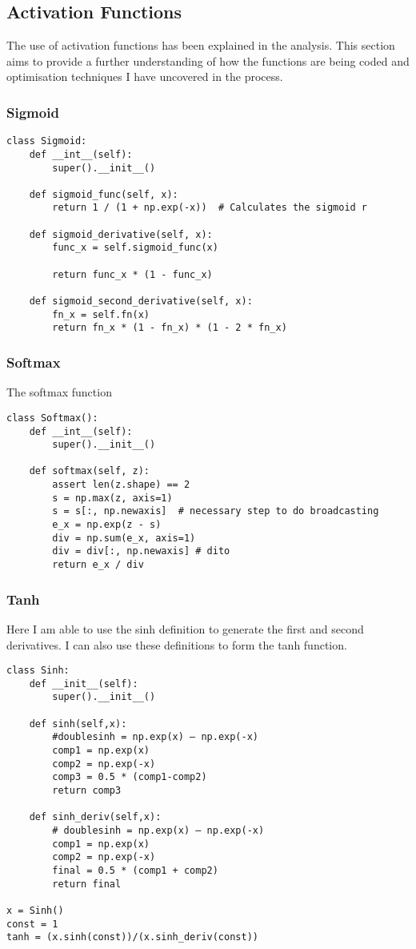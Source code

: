 \documentclass{article}
\begin{document}
\subsection{Activation Functions}
The use of activation functions has been explained in the analysis. This section
aims to provide a further understanding of how the functions are being coded and
optimisation techniques I have uncovered in the process.
\subsubsection{Sigmoid}
\begin{lstlisting}
class Sigmoid:
    def __int__(self):
        super().__init__()

    def sigmoid_func(self, x):
        return 1 / (1 + np.exp(-x))  # Calculates the sigmoid r

    def sigmoid_derivative(self, x):
        func_x = self.sigmoid_func(x)

        return func_x * (1 - func_x)

    def sigmoid_second_derivative(self, x):
        fn_x = self.fn(x)
        return fn_x * (1 - fn_x) * (1 - 2 * fn_x)

\end{lstlisting}
\subsubsection{Softmax}
The softmax function


\begin{lstlisting}
class Softmax():
    def __int__(self):
        super().__init__()

    def softmax(self, z):
        assert len(z.shape) == 2
        s = np.max(z, axis=1)
        s = s[:, np.newaxis]  # necessary step to do broadcasting
        e_x = np.exp(z - s)
        div = np.sum(e_x, axis=1)
        div = div[:, np.newaxis] # dito
        return e_x / div
\end{lstlisting}


\subsubsection{Tanh}
Here I am able to use the sinh definition to generate the first and second
derivatives. I can also use these definitions to form the tanh function.


\begin{lstlisting}
class Sinh:
    def __init__(self):
        super().__init__()

    def sinh(self,x):
        #doublesinh = np.exp(x) – np.exp(-x)
        comp1 = np.exp(x)
        comp2 = np.exp(-x)
        comp3 = 0.5 * (comp1-comp2)
        return comp3

    def sinh_deriv(self,x):
        # doublesinh = np.exp(x) – np.exp(-x)
        comp1 = np.exp(x)
        comp2 = np.exp(-x)
        final = 0.5 * (comp1 + comp2)
        return final

x = Sinh()
const = 1
tanh = (x.sinh(const))/(x.sinh_deriv(const))
\end{lstlisting}
\end{document}
